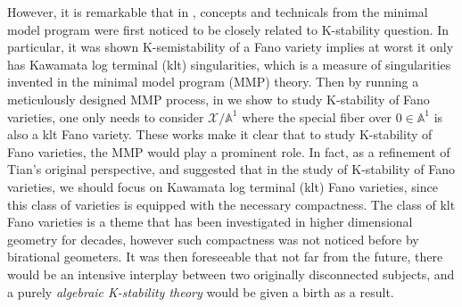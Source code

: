 \documentclass[12pt,reqno]{amsart}%
\newcommand{\bA}{{\mathbb{A} }}
\newcommand{\cX}{{\mathcal{X}}}
\theoremstyle{definition}
\theoremstyle{remark}
\begin{document}
However,  it is remarkable that  in \cite{Oda13},  concepts and technicals from the minimal model program were first noticed to be closely related to K-stability question. In particular, it was shown K-semistability of a Fano variety implies at worst it only has Kawamata log terminal (klt) singularities, which is a measure of singularities invented in the minimal model program (MMP) theory.  Then by running a meticulously designed MMP process, in \cite{LX14} we show to study K-stability of Fano varieties, one only needs to consider $\cX/\bA^1$ where the special fiber over $0\in \bA^1$ is also a klt Fano variety. These works make it clear that to study K-stability of Fano varieties, the MMP would play a prominent role. In fact, as a refinement of Tian's original perspective, \cite{Oda13} and \cite{LX14} suggested that in the study of K-stability of Fano varieties, we should focus on Kawamata log terminal (klt) Fano varieties, since this class of varieties is equipped with the necessary compactness. The class of klt Fano varieties is a theme that has been investigated in higher dimensional geometry for decades, however such compactness was not noticed before by birational geometers. It was then foreseeable that not far from the future, there would be an intensive interplay between two originally disconnected subjects, and a purely  \emph{algebraic K-stability theory} would be given a birth as a result.

\smallskip
\end{document}
